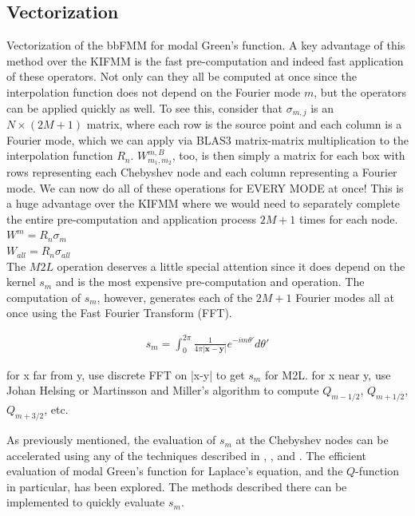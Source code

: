 \documentclass[11pt, oneside]{article}   	%
\begin{document}
\subsection{Vectorization}
Vectorization of the bbFMM for modal Green's function. A key advantage of this method over the KIFMM is the fast pre-computation and indeed fast application of these operators. Not only can they all be computed at once since the interpolation function does not depend on the Fourier mode $m$, but the operators can be applied quickly as well. To see this, consider that $\sigma_{m,j}$ is an $N\times (2M+1)$ matrix, where each row is the source point and each column is a Fourier mode, which we can apply via BLAS3 matrix-matrix multiplication to the interpolation function $R_n$. $W_{m_1,m_2}^{m,B}$, too, is then simply a matrix for each box with rows representing each Chebyshev node and each column representing a Fourier mode. We can now do all of these operations for EVERY MODE at once! This is a huge advantage over the KIFMM where we would need to separately complete the entire pre-computation and application process $2M+1$ times for each node.
\\

$W^m=R_n \sigma_m$\\

$W_{all} = R_n \sigma_{all}$\\

The $M2L$ operation deserves a little special attention since it does depend on the kernel $s_m$ and is the most expensive pre-computation and operation. The computation of $s_m$, however, generates each of the $2M+1$ Fourier modes all at once using the Fast Fourier Transform (FFT).

\begin{align}
s_m = \int_0^{2\pi} \frac{1}{4\pi|\mathbf{x}-\mathbf{y}|}e^{-im\theta'}d\theta'
\end{align}

for x far from y, use discrete FFT on |x-y| to get $s_m$ for M2L. for x near y, use Johan Helsing or Martinsson and Miller's algorithm to compute $Q_{m-1/2}$, $Q_{m+1/2}$, $Q_{m+3/2}$, etc.

As previously mentioned, the evaluation of $s_m$ at the Chebyshev nodes can be accelerated using any of the techniques described in \cite{A}, \cite{VBT}, and \cite{YFC}. The efficient evaluation of modal Green's function for Laplace's equation, and the $Q$-function in particular, has been explored. The methods described there can be implemented to quickly evaluate $s_m$.
\end{document}

